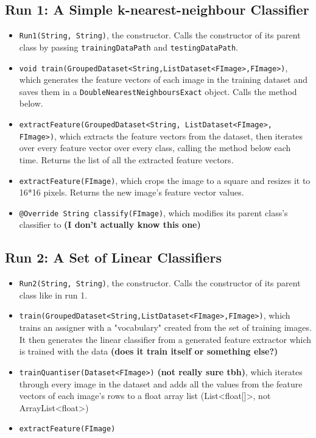\documentclass[a4paper,12pt]{article}
\begin{document}
\subsection{Run 1: A Simple k-nearest-neighbour Classifier}
\begin{itemize}
	\item \texttt{Run1(String, String)}, the constructor. Calls the constructor of its parent class by passing \texttt{trainingDataPath} and \texttt{testingDataPath}.
	\item \texttt{void train(GroupedDataset<String,ListDataset<FImage>,FImage>)}, which generates the feature vectors of each image in the training dataset and saves them in a \texttt{DoubleNearestNeighboursExact} object. Calls the method below.
	\item \texttt{extractFeature(GroupedDataset<String, ListDataset<FImage>, FImage>)}, which extracts the feature vectors from the dataset, then iterates over every feature vector over every class, calling the method below each time. Returns the list of all the extracted feature vectors.
	\item \texttt{extractFeature(FImage)}, which crops the image to a square and resizes it to 16*16 pixels. Returns the new image's feature vector values.
	\item \texttt{@Override String classify(FImage)}, which modifies its parent class's classifier to \textbf{(I don't actually know this one)}
\end{itemize}

\subsection{Run 2: A Set of Linear Classifiers}
\begin{itemize}
	\item \texttt{Run2(String, String)}, the constructor. Calls the constructor of its parent class like in run 1.
	\item \texttt{train(GroupedDataset<String,ListDataset<FImage>,FImage>)}, which trains an assigner with a "vocabulary" created from the set of training images. It then generates the linear classifier from a generated feature extractor which is trained with the data \textbf{(does it train itself or something else?)}
	\item \texttt{trainQuantiser(Dataset<FImage>)} \textbf{(not really sure tbh)}, which iterates through every image in the dataset and adds all the values from the feature vectors of each image's rows to a float array list (List<float[]>, not ArrayList<float>)
	\item \texttt{extractFeature(FImage)}
\end{itemize}
\end{document}
